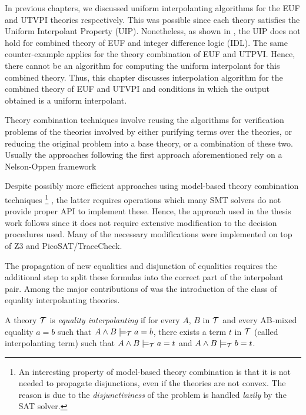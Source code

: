 In previous chapters, we discussed uniform 
interpolanting algorithms
for the EUF and UTVPI theories respectively. 
This was possible since
each theory satisfies the Uniform Interpolant 
Property (UIP). Nonetheless, 
as shown in \cite{10.1007/978-3-030-51074-9_11}, the UIP does 
not hold for combined theory of EUF and integer 
difference logic (IDL). The same counter-example applies for the
theory combination of EUF and UTPVI. Hence, there cannot be
an algorithm for computing the uniform interpolant for this 
combined theory. Thus, this chapter discusses interpolation
algorithm for the combined theory of EUF and UTVPI and conditions
in which the output obtained is a uniform interpolant.

Theory combination techniques involve 
reusing the algorithms for verification 
problems of the theories involved 
by either purifying terms over the 
theories, or reducing the original problem 
into a base theory, or a combination of these two. 
Usually the approaches following the first approach 
aforementioned rely on a Nelson-Oppen
framework \cite{10.1007/11532231_26, 
10.1007/978-3-642-22119-4_1, 10.1145/2490253}

Despite possibly more efficient approaches using
model-based theory combination techniques 
\footnote{
  An interesting property of model-based theory combination 
  is that it is not needed to propagate disjunctions, even if
  the theories are not convex. The reason is due to 
  the \emph{disjunctiviness} of the problem is handled 
  \emph{lazily} by the
  SAT solver.
} \cite{10.1007/978-3-642-22119-4_1}, the latter requires 
operations which many SMT solvers do not provide 
proper API to implement these.
Hence, the approach used in the thesis work follows 
\cite{10.1007/11532231_26} since it does not require extensive
modification to the decision procedures
used. Many of the necessary modifications 
were implemented on top of Z3 and PicoSAT/TraceCheck.

The propagation of new equalities and disjunction of equalities
requires the additional step to split these formulas into
the correct part of the interpolant pair. Among the major
contributions of \cite{10.1007/11532231_26} was the introduction
of the class of equality interpolanting theories.

\begin{definition}
  A theory $\cal{T}$ is \emph{equality interpolanting}
  if for every $A$, $B$ in $\cal{T}$ and every AB-mixed
  equality $a = b$ such that $A \land B \models_{\cal{T}} a = b$,
  there exists a term $t$
  in $\cal{T}$ (called interpolanting term)
  such that $A \land B \models_{\cal{T}} a = t$ and 
  $A \land B \models_{\cal{T}} b = t$.
\end{definition}

